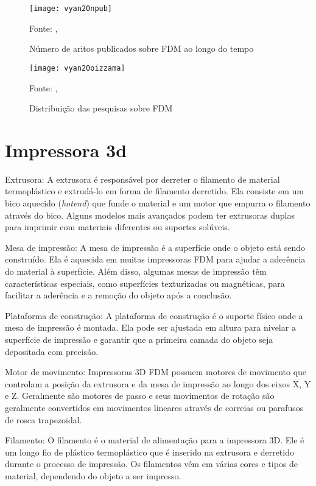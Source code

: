 \begin{figure}[H]
    \centering
    \caption{Número de aritos publicados sobre FDM ao longo do tempo}
    \texttt{[image: vyan20npub]}
    
    {\footnotesize Fonte: \citeauthor{vyavahare20}, \citeyear{vyavahare20}}
    \label{fig:numero_artigos}
\end{figure}

\begin{figure}[H]
    \centering
    \caption{Distribuição das pesquisas sobre FDM}
    \texttt{[image: vyan20oizzama]}

    {\footnotesize Fonte: \citeauthor{vyavahare20}, \citeyear{vyavahare20}}
    \label{fig:distr_artigos}
\end{figure}


\section{Impressora 3d}

Extrusora: A extrusora é responsável por derreter o filamento de material termoplástico e extrudá-lo 
em forma de filamento derretido. 
Ela consiste em um bico aquecido (\textit{hotend}) que funde o material e um motor que empurra o 
filamento através do bico. Alguns modelos mais avançados podem ter extrusoras duplas para 
imprimir com materiais diferentes ou suportes solúveis.

Mesa de impressão: A mesa de impressão é a superfície onde o objeto está sendo construído. 
Ela é aquecida em muitas impressoras FDM para ajudar a aderência do material à superfície. 
Além disso, algumas mesas de impressão têm características especiais, como superfícies 
texturizadas ou magnéticas, para facilitar a aderência e a remoção do objeto após a conclusão.

Plataforma de construção: A plataforma de construção é o suporte físico onde a mesa de impressão é montada. 
Ela pode ser ajustada em altura para nivelar a superfície de impressão e garantir que a primeira camada do 
objeto seja depositada com precisão.

Motor de movimento: Impressoras 3D FDM possuem motores de movimento que controlam a posição da extrusora e 
da mesa de impressão ao longo dos eixos X, Y e Z. Geralmente são motores de passo e seus movimentos de rotação
são geralmente convertidos em movimentos lineares através de correias ou parafusos de rosca trapezoidal.

Filamento: O filamento é o material de alimentação para a impressora 3D. Ele é um longo fio de plástico 
termoplástico que é inserido na extrusora e derretido durante o processo de impressão. Os filamentos vêm 
em várias cores e tipos de material, dependendo do objeto a ser impresso.

